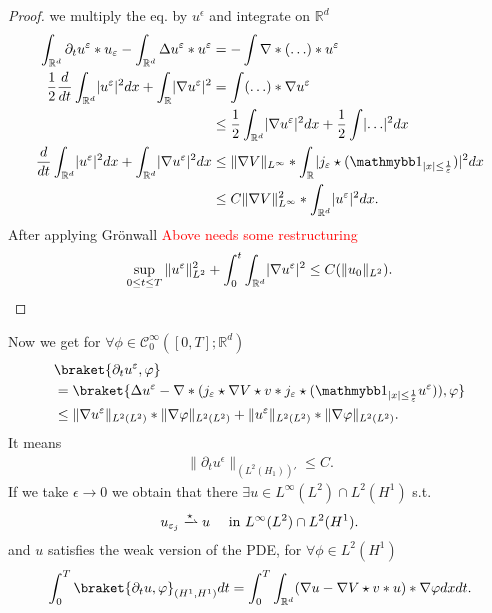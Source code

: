   \begin{proof}
   we multiply the eq. by $u^{\epsilon} $  and integrate on $\mathbb{R}^{d} $
   \begin{align*}
     \int_{\mathbb{R}^{d} } \partial_t u^{\epsilon} * u_{\epsilon} -  \int_{\mathbb{R}^{d} } \Delta u^{\epsilon}  * u^{\epsilon}  &= - \int \nabla * (\ldots )* u^{\epsilon} \\
     \frac{1}{2}\frac{d}{dt} \int_{\mathbb{R}^{d} } \abs{u^{\epsilon} }^2 dx + \int_{\mathbb{R} } \abs{\nabla u^{\epsilon} }^2  &= \int (\ldots )* \nabla u ^{\epsilon}  \\
     &\le  \frac{1}{2} \int_{\mathbb{R}^{d} } \abs{ \nabla u^{\epsilon}  }^2 dx +  \frac{1}{2} \int  \abs{\ldots } ^2 dx \\
     \frac{d}{dt} \int_{\mathbb{R}^{d} } \abs{u^{\epsilon} }^2 dx + \int_{\mathbb{R}^{d} } \abs{\nabla u^{\epsilon} }^2 dx &\le  \|\nabla V\|_{L^{\infty} } * \int_{\mathbb{R}^{} } \abs{j_{\epsilon} \star (\cha_{\abs{x}\le \frac{1}{\epsilon}})}^2 dx\\
     &\le C \|\nabla V\|^2_{L^{\infty} } * \int_{\mathbb{R}^{d} } \abs{u^{\epsilon} }^2 dx
   .\end{align*}
   After applying Grönwall  \textcolor{Red}{Above needs some restructuring}
   \begin{align*}
     \sup_{0 \le t \le T} \|u^{\varepsilon} \|^2_{L^{2} } + \int_0^{t} \int_{\mathbb{R}^{d} } \lvert\nabla u^{\varepsilon} \rvert^2 \le  C(\|u_0\|_{L^{2} })
   .\end{align*}
   \end{proof}
   Now we get for $\forall  \phi  \in  \mathcal{C}_0^{\infty}([0,T];\mathbb{R}^{d} ) $
   \begin{align*}
     &\braket{\partial_t u^{\epsilon},\phi  } \\
    &= \braket{\Delta  u ^{\epsilon} - \nabla * (j_{\epsilon} \star  \nabla V \star  v * j_{\epsilon} \star  (\cha_{\abs{x}\le \frac{1}{\epsilon}}u^{\epsilon} )), \phi  }\\
    &\le \|\nabla u ^{\epsilon} \|_{L^{2}(L^{2} ) } * \|\nabla \phi \|_{L^{2}(L^{2} ) } + \|u^{\epsilon} \|_{L^{2}(L^{2} ) } * \|\nabla \phi \|_{L^{2}(L^{2} ) }
   .\end{align*}
   It means 
   \begin{align*}
     \|\partial_t u^{\epsilon} \|_{(L^{2}(H_{1}) )'}\le C
   .\end{align*}
   If we take $\epsilon \to  0$ we obtain that there $\exists  u \in L^{\infty}(L^{2} ) \cap L^{2}(H^{1} ) $ s.t. 
   \begin{align*}
     u_{\epsilon_j} \xrightharpoonup{\star } u  \quad \text{ in } L^{\infty}(L^{2} ) \cap L^{2}(H^{1} )  
   .\end{align*}
   and $u$ satisfies the weak version of the PDE, for $\forall  \phi \in  L^{2}(H^{1} ) $
   \begin{align*}
     \int_0^{T}    \braket{\partial_t u , \phi }_{(H^{1},H^{1}  )} dt = \int_0^{T} \int_{\mathbb{R}^{d} }   (\nabla u -\nabla V \star v * u) *\nabla \phi  dx dt
   .\end{align*}
